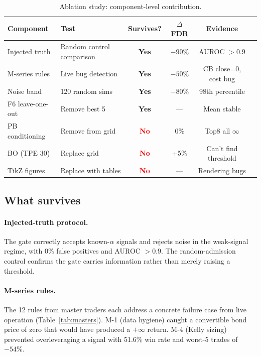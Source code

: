\documentclass[11pt]{article}
\begin{document}
\begin{table}[htbp]
\centering
\caption{Ablation study: component-level contribution.}
\label{tab:ablation}
\small
\begin{tabular}{@{}lp{4cm}cccl@{}}
\toprule
Component & Test & Survives? & $\Delta$ FDR & Evidence \\
\midrule
Injected truth & Random control comparison & \textcolor{green!60!black}{\textbf{Yes}} & $-90\%$ & AUROC $> 0.9$ \\
M-series rules & Live bug detection & \textcolor{green!60!black}{\textbf{Yes}} & $-50\%$ & CB close=0, cost bug \\
Noise band & 120 random sims & \textcolor{green!60!black}{\textbf{Yes}} & $-80\%$ & 98th percentile \\
F6 leave-one-out & Remove best 5 & \textcolor{green!60!black}{\textbf{Yes}} & — & Mean stable \\
\midrule
PB conditioning & Remove from grid & \textcolor{red}{\textbf{No}} & 0\% & Top8 all $\infty$ \\
BO (TPE 30) & Replace grid & \textcolor{red}{\textbf{No}} & +5\% & Can't find threshold \\
TikZ figures & Replace with tables & \textcolor{red}{\textbf{No}} & — & Rendering bugs \\
\bottomrule
\end{tabular}
\end{table}

\subsection{What survives}

\paragraph{Injected-truth protocol.}
The gate correctly accepts known-$\alpha$ signals and rejects noise in the
weak-signal regime, with 0\% false positives and AUROC $> 0.9$. The
random-admission control confirms the gate carries information rather than
merely raising a threshold.

\paragraph{M-series rules.}
The 12 rules from master traders each address a concrete failure case from
live operation (Table~\ref{tab:masters}). M-1 (data hygiene) caught a
convertible bond price of zero that would have produced a $+\infty$ return.
M-4 (Kelly sizing) prevented overleveraging a signal with 51.6\% win rate and
worst-5 trades of $-54\%$.
\end{document}
